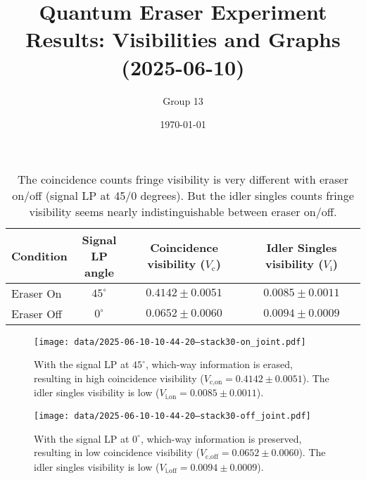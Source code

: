 \documentclass{article}
\title{Quantum Eraser Experiment Results: Visibilities and Graphs (2025-06-10)}
\author{Group 13} %
\date{\today}
\begin{document}
\pagestyle{empty} %

\begin{table}[h!]
\centering
\begin{tabular}{lccc}
\toprule
Condition & \makecell{Signal \\ LP angle} & \makecell{Coincidence \\ visibility ($V_{\text{c}}$)} & \makecell{Idler Singles \\ visibility ($V_{\text{i}}$)} \\
\midrule
Eraser On   & $45^\circ$ & $0.4142 \pm 0.0051$ & $0.0085 \pm 0.0011$ \\
Eraser Off  & $0^\circ$  & $0.0652 \pm 0.0060$ & $0.0094 \pm 0.0009$ \\
\bottomrule
\end{tabular}
\caption*{
  The coincidence counts fringe visibility is very different with eraser on/off (signal LP at 45/0 degrees).
  But the idler singles counts fringe visibility seems nearly indistinguishable between eraser on/off.
}
\end{table}

\begin{figure}[h!]
\centering
\texttt{[image: data/2025-06-10-10-44-20--stack30-on\_joint.pdf]}
\caption*{
  With the signal LP at $45^\circ$, which-way information is erased, resulting in high coincidence visibility ($V_{\text{c,on}}=0.4142 \pm 0.0051$). The idler singles visibility is low ($V_{\text{i,on}}=0.0085 \pm 0.0011$).
}
\end{figure}

\begin{figure}[h!]
\centering
\texttt{[image: data/2025-06-10-10-44-20--stack30-off\_joint.pdf]}
\caption*{
  With the signal LP at $0^\circ$, which-way information is preserved, resulting in low coincidence visibility ($V_{\text{c,off}}=0.0652 \pm 0.0060$). The idler singles visibility is low ($V_{\text{i,off}}=0.0094 \pm 0.0009$).
}
\end{figure}
\end{document}
